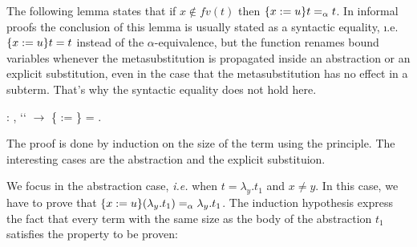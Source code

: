 \begin{coqdoccode}
\coqdocemptyline
\coqdocemptyline
\coqdocemptyline
\end{coqdoccode}
The following lemma states that if $x \notin fv(t)$ then $\metasub{t}{x}{u} =_\alpha t$. In informal proofs the conclusion of this lemma is usually stated as a syntactic equality, {\i.e.} $\metasub{t}{x}{u} = t$ instead of the $\alpha$-equivalence, but the function  renames bound variables whenever the metasubstitution is propagated inside an abstraction or an explicit substitution, even in the case that the metasubstitution has no effect in a subterm. That's why the syntactic equality does not hold here. 
\begin{coqdoccode}
\coqdocemptyline
\coqdocnoindent
{} : \coqdockw{\ensuremath{\forall}}   ,  ``   \ensuremath{\rightarrow} \{ := \} = .\coqdoceol
\end{coqdoccode}
 The proof is done by induction on the size of the term  using the  principle. The interesting cases are the abstraction and the explicit substituion.
\begin{coqdoccode}
\end{coqdoccode}
We focus in the abstraction case, {\it i.e.} when $t = \lambda_y.t_1$ and $x \neq y$. In this case, we have to prove that $\metasub{(\lambda_y.t_1)}{x}{u} =_\alpha \lambda_y.t_1$. The induction hypothesis express the fact that every term with the same size as the body of the abstraction $t_1$ satisfies the property to be proven:



